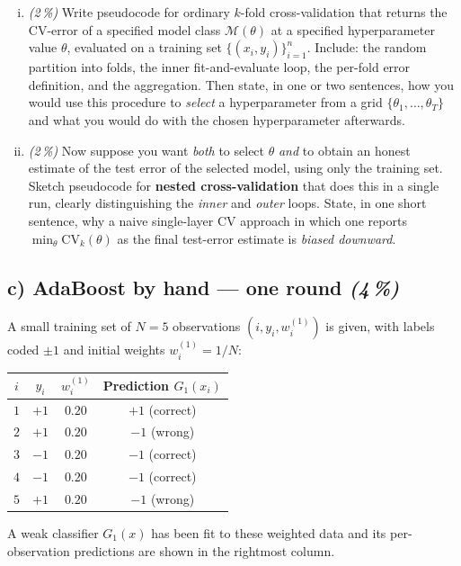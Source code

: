 \documentclass[11pt,a4paper]{article}
\newcommand{\subpoints}[1]{\textit{(#1\,\%)}}
\begin{document}
\begin{enumerate}[(i)]
  \item \subpoints{2} Write pseudocode for ordinary $k$-fold cross-validation that returns the CV-error of a specified model class $\mathcal M(\theta)$ at a specified hyperparameter value $\theta$, evaluated on a training set $\{(x_i, y_i)\}_{i=1}^n$. Include: the random partition into folds, the inner fit-and-evaluate loop, the per-fold error definition, and the aggregation. Then state, in one or two sentences, how you would use this procedure to \emph{select} a hyperparameter from a grid $\{\theta_1, \dots, \theta_T\}$ and what you would do with the chosen hyperparameter afterwards.
  \item \subpoints{2} Now suppose you want \emph{both} to select $\theta$ \emph{and} to obtain an honest estimate of the test error of the selected model, using only the training set. Sketch pseudocode for \textbf{nested cross-validation} that does this in a single run, clearly distinguishing the \emph{inner} and \emph{outer} loops. State, in one short sentence, why a naive single-layer CV approach in which one reports $\min_\theta \mathrm{CV}_k(\theta)$ as the final test-error estimate is \emph{biased downward}.
\end{enumerate}

\subsection*{c) AdaBoost by hand --- one round \subpoints{4}}

A small training set of $N = 5$ observations $(i, y_i, w_i^{(1)})$ is given, with labels coded $\pm 1$ and initial weights $w_i^{(1)} = 1/N$:

\begin{center}\small
\begin{tabular}{cccc}
\toprule
$i$ & $y_i$ & $w_i^{(1)}$ & Prediction $G_1(x_i)$ \\
\midrule
$1$ & $+1$ & $0.20$ & $+1$ (correct) \\
$2$ & $+1$ & $0.20$ & $-1$ (wrong) \\
$3$ & $-1$ & $0.20$ & $-1$ (correct) \\
$4$ & $-1$ & $0.20$ & $-1$ (correct) \\
$5$ & $+1$ & $0.20$ & $-1$ (wrong) \\
\bottomrule
\end{tabular}
\end{center}

A weak classifier $G_1(x)$ has been fit to these weighted data and its per-observation predictions are shown in the rightmost column.
\end{document}
